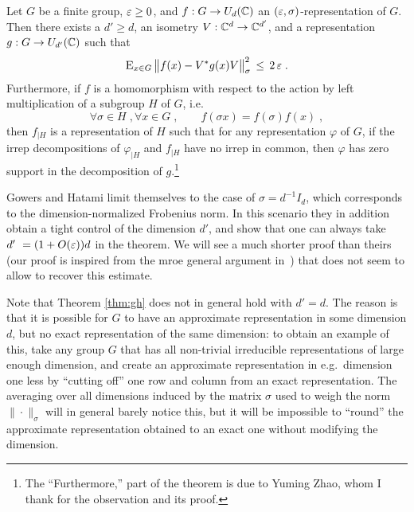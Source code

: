 \begin{theorem}\label{thm:gh}
Let $G$ be a finite group, $\varepsilon\geq 0$, and $f:G\to U_d(\mathbb{C})$ an $(\varepsilon,\sigma)$-representation of $G$. Then there exists a $d'\geq d$, an isometry $V:\mathbb{C}^d\to \mathbb{C}^{d'}$, and a representation $g:G\to U_{d'}(\mathbb{C})$ such that 
\begin{equation}\label{eq:gh-ccl}
\textsc{E}_{x\in G}\, \big\| f(x) - V^*g(x)V \big\|_\sigma^2\, \leq\, 2\,\varepsilon\;.
\end{equation} 
Furthermore, if $f$ is a homomorphism with respect to the action by left multiplication of a subgroup $H$ of $G$, i.e.\
\begin{equation}\label{eq:gh-sbgp}
 \forall \sigma\in H\;,\forall x\in G\;,\qquad f(\sigma  x)=f(\sigma) f(x)\;,
\end{equation}
then $f_{|H}$ is a representation of $H$ such that for any representation $\varphi$ of $G$, if the irrep decompositions of $\varphi_{|H}$ and $f_{|H}$ have no irrep in common, then $\varphi$ has zero support in the decomposition of $g$.\footnote{The ``Furthermore,'' part of the theorem is due to Yuming Zhao, whom I thank for the observation and its proof.}
\end{theorem}

Gowers and Hatami limit themselves to the case of $\sigma = d^{-1}I_d$, which corresponds to the dimension-normalized Frobenius norm. In this scenario they in addition obtain a tight control of the dimension $d'$, and show that one can always take $d'\ = (1+O(\varepsilon))d$ in the theorem. We will see a much shorter proof than theirs (our proof is inspired from the mroe general argument in~\cite{de2017operator}) that does not seem to allow to recover this estimate. 

Note that  Theorem \ref{thm:gh} does not in general hold  with $d'=d$. The reason is that it is possible for $G$ to have an approximate representation in some dimension $d$, but no exact representation of the same dimension: to obtain an example of this, take any group $G$ that has all non-trivial irreducible representations of large enough dimension, and create an approximate representation in e.g.\ dimension one less by ``cutting off'' one row and column from an exact representation. The averaging over all dimensions induced by the matrix $\sigma$ used to weigh the norm $\|\cdot\|_\sigma$ will in general barely notice this, but it will be impossible to ``round'' the approximate representation obtained to an exact one without modifying the dimension. 

